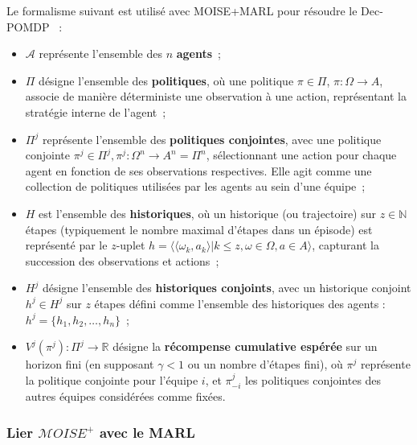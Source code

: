 Le formalisme suivant est utilisé avec MOISE+MARL pour résoudre le Dec-POMDP~\cite{Beynier2013,Albrecht2024} :
\begin{itemize}
    \item $\mathcal{A}$ représente l'ensemble des $n$ \textbf{agents}~;
    \item $\Pi$ désigne l'ensemble des \textbf{politiques}, où une politique $\pi \in \Pi$, $\pi: \Omega \rightarrow A$, associe de manière déterministe une observation à une action, représentant la stratégie interne de l'agent~;
    \item $\Pi^{j}$ représente l'ensemble des \textbf{politiques conjointes}, avec une politique conjointe $\pi^{j} \in \Pi^{j}, \pi^{j}: \Omega^n \rightarrow A^n = \Pi^n$, sélectionnant une action pour chaque agent en fonction de ses observations respectives. Elle agit comme une collection de politiques utilisées par les agents au sein d'une équipe~;
    \item $H$ est l'ensemble des \textbf{historiques}, où un historique (ou trajectoire) sur $z \in \mathbb{N}$ étapes (typiquement le nombre maximal d'étapes dans un épisode) est représenté par le $z$-uplet $h = \langle \langle \omega_{k}, a_{k}\rangle | k \leq z, \omega \in \Omega, a \in A\rangle$, capturant la succession des observations et actions~;
    \item $H^{j}$ désigne l'ensemble des \textbf{historiques conjoints}, avec un historique conjoint $h^{j} \in H^{j}$ sur $z$ étapes défini comme l'ensemble des historiques des agents : $h^{j} = \{h_1, h_2, \dots, h_n\}$~;
    \item $V^{j}(\pi^{j}): \Pi^{j} \rightarrow \mathbb{R}$ désigne la \textbf{récompense cumulative espérée} sur un horizon fini (en supposant $\gamma < 1$ ou un nombre d'étapes fini), où $\pi^{j}$ représente la politique conjointe pour l'équipe $i$, et $\pi^{j}_{-i}$ les politiques conjointes des autres équipes considérées comme fixées.
\end{itemize}


\subsubsection{Lier $\mathcal{M}OISE^+$ avec le MARL}

